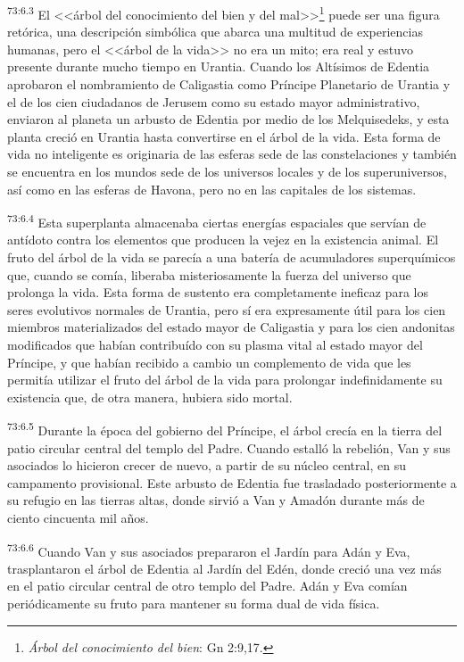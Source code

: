 \par
\textsuperscript{73:6.3} El <<árbol del conocimiento del bien y del mal>>\footnote{\textit{Árbol del conocimiento del bien}: Gn 2:9,17.} puede ser una figura retórica, una descripción simbólica que abarca una multitud de experiencias humanas, pero el <<árbol de la vida>> no era un mito; era real y estuvo presente durante mucho tiempo en Urantia. Cuando los Altísimos de Edentia aprobaron el nombramiento de Caligastia como Príncipe Planetario de Urantia y el de los cien ciudadanos de Jerusem como su estado mayor administrativo, enviaron al planeta un arbusto de Edentia por medio de los Melquisedeks, y esta planta creció en Urantia hasta convertirse en el árbol de la vida. Esta forma de vida no inteligente es originaria de las esferas sede de las constelaciones y también se encuentra en los mundos sede de los universos locales y de los superuniversos, así como en las esferas de Havona, pero no en las capitales de los sistemas.

\par
\textsuperscript{73:6.4} Esta superplanta almacenaba ciertas energías espaciales que servían de antídoto contra los elementos que producen la vejez en la existencia animal. El fruto del árbol de la vida se parecía a una batería de acumuladores superquímicos que, cuando se comía, liberaba misteriosamente la fuerza del universo que prolonga la vida. Esta forma de sustento era completamente ineficaz para los seres evolutivos normales de Urantia, pero sí era expresamente útil para los cien miembros materializados del estado mayor de Caligastia y para los cien andonitas modificados que habían contribuído con su plasma vital al estado mayor del Príncipe, y que habían recibido a cambio un complemento de vida que les permitía utilizar el fruto del árbol de la vida para prolongar indefinidamente su existencia que, de otra manera, hubiera sido mortal.

\par
\textsuperscript{73:6.5} Durante la época del gobierno del Príncipe, el árbol crecía en la tierra del patio circular central del templo del Padre. Cuando estalló la rebelión, Van y sus asociados lo hicieron crecer de nuevo, a partir de su núcleo central, en su campamento provisional. Este arbusto de Edentia fue trasladado posteriormente a su refugio en las tierras altas, donde sirvió a Van y Amadón durante más de ciento cincuenta mil años.

\par
\textsuperscript{73:6.6} Cuando Van y sus asociados prepararon el Jardín para Adán y Eva, trasplantaron el árbol de Edentia al Jardín del Edén, donde creció una vez más en el patio circular central de otro templo del Padre. Adán y Eva comían periódicamente su fruto para mantener su forma dual de vida física.

